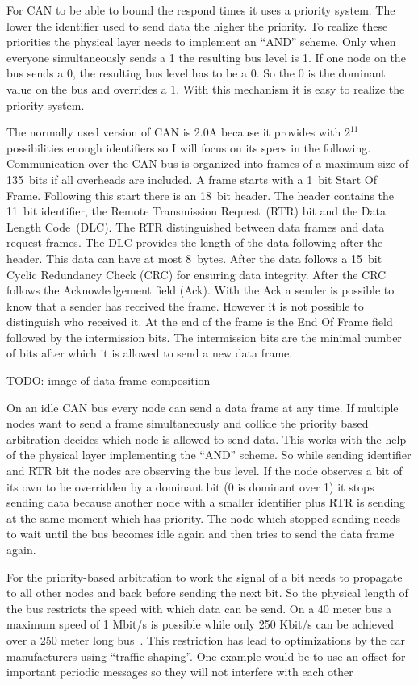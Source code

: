 For CAN to be able to bound the respond times it uses a priority system. The
lower the identifier used to send data the higher the priority. To realize these
priorities the physical layer needs to implement an ``AND'' scheme. Only when
everyone simultaneously sends a 1 the resulting bus level is 1. If one node on
the bus sends a 0, the resulting bus level has to be a 0. So the 0 is the
dominant value on the bus and overrides a 1. With this mechanism it is easy to
realize the priority system.

The normally used version of CAN is 2.0A because it provides with \(2^{11}\)
possibilities enough identifiers so I will focus on its specs in the following.
Communication over the CAN bus is organized into frames of a maximum size of
135~bits if all overheads are included. A frame starts with a 1~bit Start Of
Frame. Following this start there is an 18~bit header. The header contains the
11~bit identifier, the Remote Transmission Request~(RTR) bit and the Data Length
Code~(DLC). The RTR distinguished between data frames and data request frames.
The DLC provides the length of the data following after the header. This data
can have at most 8~bytes. After the data follows a 15~bit Cyclic Redundancy
Check (CRC) for ensuring data integrity. After the CRC follows the
Acknowledgement field (Ack). With the Ack a sender is possible to know that a
sender has received the frame. However it is not possible to distinguish who
received it. At the end of the frame is the End Of Frame field followed by the
intermission bits. The intermission bits are the minimal number of bits after
which it is allowed to send a new data frame.

TODO\@: image of data frame composition

On an idle CAN bus every node can send a data frame at any time. If multiple
nodes want to send a frame simultaneously and collide the priority based
arbitration decides which node is allowed to send data. This works with the help
of the physical layer implementing the ``AND'' scheme. So while sending
identifier and RTR bit the nodes are observing the bus level. If the node
observes a bit of its own to be overridden by a dominant bit (0 is dominant over
1) it stops sending data because another node with a smaller identifier plus RTR
is sending at the same moment which has priority. The node which stopped sending
needs to wait until the bus becomes idle again and then tries to send the data
frame again.

For the priority-based arbitration to work the signal of a bit needs to
propagate to all other nodes and back before sending the next bit. So the
physical length of the bus restricts the speed with which data can be send. On a
40 meter bus a maximum speed of 1 Mbit/s is possible while only 250 Kbit/s can
be achieved over a 250 meter long bus~\cite{Navet2017}. This restriction has
lead to optimizations by the car manufacturers using ``traffic shaping''. One
example would be to use an offset for important periodic messages so they will
not interfere with each other~\cite{Navet2009}


